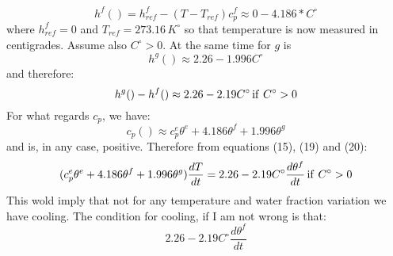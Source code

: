 \begin{equation}
h^f() = h^f_{ref} -(T-T_{ref})c_p^f \approx 0 - 4.186*  C^\circ   
\end{equation}
where \(h_{ref}^f=0\) and \(T_{ref} = 273.16\, K^\circ\) so that temperature is now measured in centigrades. Assume also \(C^\circ >0 \).
At the same time for \(g\) is 
\begin{equation}
h^g( ) \approx 2.26  - 1.996 C^\circ
\end{equation}
and therefore:
\begin{equation}
h^g()-h^f() \approx 2.26 - 2.19 C^\circ \, {\rm if}\ C^\circ > 0
\end{equation}
For what regards \( c_p\), we have:
\begin{equation}
c_p() \approx c_p^e \theta^e + 4.186 \theta^f + 1.996 \theta^g
\end{equation}
and is, in any case, positive.
Therefore from equations (15), (19) and (20):
\begin{equation}
(c_p^e \theta^e + 4.186 \theta^f + 1.996 \theta^g) \frac{dT}{dt} = 2.26 - 2.19 C^\circ \frac{d\theta^f}{dt}\, {\rm if}\ C^\circ > 0
\end{equation}
This wold imply that not for any temperature and water fraction variation we have cooling. The condition for cooling, if I am not wrong is that:
\begin{equation}
2.26 - 2.19 C^\circ \frac{d\theta^f}{dt}
\end{equation}